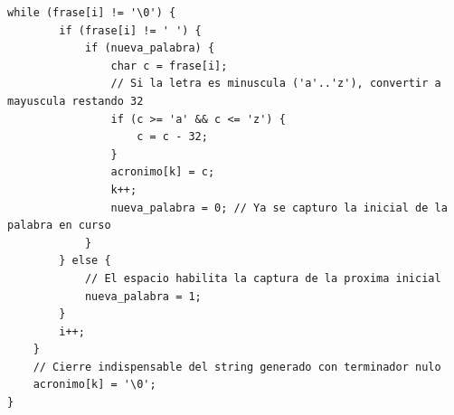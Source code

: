 \documentclass[11pt,letterpaper]{article}
\begin{document}
\begin{enumerate}[label=\textbf{\arabic*.}]
\begin{enumerate}[label=(\alph*), resume]
\begin{solucionbox}
\begin{lstlisting}[style=customc]
    while (frase[i] != '\0') {
        if (frase[i] != ' ') {
            if (nueva_palabra) {
                char c = frase[i];
                // Si la letra es minuscula ('a'..'z'), convertir a mayuscula restando 32
                if (c >= 'a' && c <= 'z') {
                    c = c - 32;
                }
                acronimo[k] = c;
                k++;
                nueva_palabra = 0; // Ya se capturo la inicial de la palabra en curso
            }
        } else {
            // El espacio habilita la captura de la proxima inicial
            nueva_palabra = 1;
        }
        i++;
    }
    // Cierre indispensable del string generado con terminador nulo
    acronimo[k] = '\0';
}
        \end{lstlisting}
        \end{solucionbox}
    \end{enumerate}

\end{enumerate}
\end{document}
